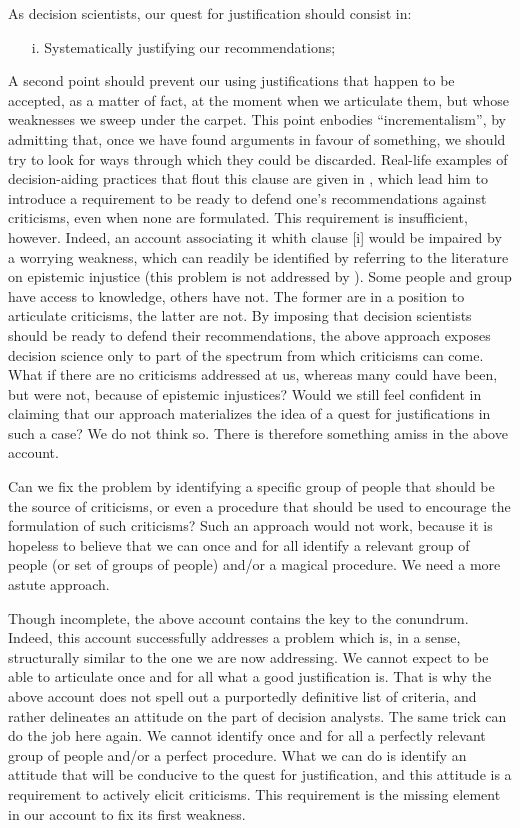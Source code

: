 \documentclass[preprint, french, english, 11pt, authoryear]{elsarticle}%
\begin{document}
As decision scientists, our quest for justification should consist in:
\begin{itemize}
\item[i.]	Systematically justifying our recommendations;
\end{itemize}

A second point should prevent our using justifications that happen to be accepted, as a matter of fact, at the moment when we articulate them, but whose weaknesses we sweep under the carpet. This point enbodies ``incrementalism'', by admitting that, once we have found arguments in favour of something, we should try to look for ways through which they could be discarded. Real-life examples of decision-aiding practices that flout this clause are given in \cite{meinard_what_2017}, which lead him to introduce a requirement to be ready to defend one's recommendations against criticisms, even when none are formulated. This requirement is insufficient, however. Indeed, an account associating it whith clause [i] would be impaired by a worrying weakness, which can readily be identified by referring to the literature on epistemic injustice \cite{fricker_epistemic_2007} (this problem is not addressed by \cite{meinard_what_2017}). Some people and group have access to knowledge, others have not. The former are in a position to articulate criticisms, the latter are not. By imposing that decision scientists should be ready to defend their recommendations, the above approach exposes decision science only to part of the spectrum from which criticisms can come. What if there are no criticisms addressed at us, whereas many could have been, but were not, because of epistemic injustices? Would we still feel confident in claiming that our approach materializes the idea of a quest for justifications in such a case? We do not think so. There is therefore something amiss in the above account.

Can we fix the problem by identifying a specific group of people that should be the source of criticisms, or even a procedure that should be used to encourage the formulation of such criticisms? Such an approach would not work, because it is hopeless to believe that we can once and for all identify a relevant group of people (or set of groups of people) and/or a magical procedure. We need a more astute approach.

Though incomplete, the above account contains the key to the conundrum. Indeed, this account successfully addresses a problem which is, in a sense, structurally similar to the one we are now addressing. We cannot expect to be able to articulate once and for all what a good justification is. That is why the above account does not spell out a purportedly definitive list of criteria, and rather delineates an attitude on the part of decision analysts. The same trick can do the job here again. We cannot identify once and for all a perfectly relevant group of people and/or a perfect procedure. What we can do is identify an attitude that will be conducive to the quest for justification, and this attitude is a requirement to actively elicit criticisms. This requirement is the missing element in our account to fix its first weakness.
\end{document}
